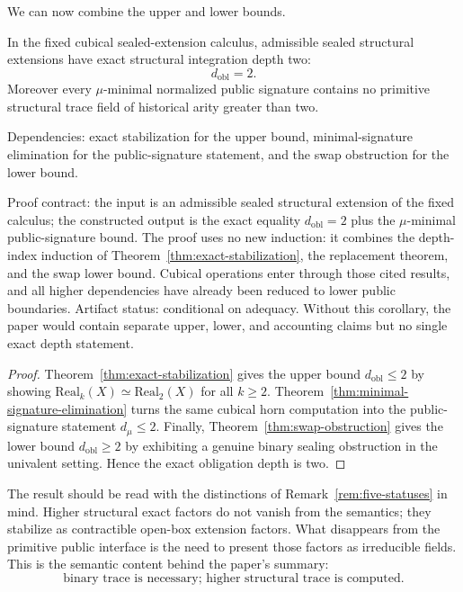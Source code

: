 \documentclass{lmcs}
\begin{document}
We can now combine the upper and lower bounds.

\begin{cor}
\label{cor:exact-depth-two}
In the fixed cubical sealed-extension calculus, admissible sealed structural extensions have
exact structural integration depth two:
\[
  d_{\mathrm{obl}}=2.
\]
Moreover every \(\mu\)-minimal normalized public signature contains no primitive structural
trace field of historical arity greater than two.

Dependencies: exact stabilization for the upper bound, minimal-signature elimination for
the public-signature statement, and the swap obstruction for the lower bound.

Proof contract: the input is an admissible sealed structural extension of the
fixed calculus; the constructed output is the exact equality
\(d_{\mathrm{obl}}=2\) plus the \(\mu\)-minimal public-signature bound.  The
proof uses no new induction: it combines the depth-index induction of
Theorem~\ref{thm:exact-stabilization}, the replacement theorem, and the swap
lower bound.  Cubical operations enter through those cited results, and all
higher dependencies have already been reduced to lower public boundaries.
Artifact status: conditional on adequacy.  Without this corollary, the paper
would contain separate upper, lower, and accounting claims but no single exact
depth statement.
\end{cor}

\begin{proof}
Theorem~\ref{thm:exact-stabilization} gives the upper bound
\(d_{\mathrm{obl}}\leq 2\) by showing
\(\mathrm{Real}_k(X)\simeq\mathrm{Real}_2(X)\) for all \(k\geq 2\).  Theorem~\ref{thm:minimal-signature-elimination}
turns the same cubical horn computation into the public-signature statement
\(d_\mu\leq 2\).  Finally, Theorem~\ref{thm:swap-obstruction} gives the lower bound
\(d_{\mathrm{obl}}\geq 2\) by exhibiting a genuine binary sealing obstruction in the univalent
setting.  Hence the exact obligation depth is two.
\end{proof}

The result should be read with the distinctions of Remark~\ref{rem:five-statuses} in mind.
Higher structural exact factors do not vanish from the semantics; they stabilize as
contractible open-box extension factors.  What disappears from the primitive public
interface is the need to present those factors as irreducible fields.  This is the semantic
content behind the paper's summary:
\[
  \text{binary trace is necessary; higher structural trace is computed.}
\]
\end{document}

